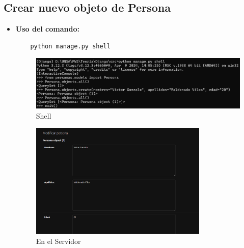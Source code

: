 \documentclass{article}
\begin{document}
  \subsection{Crear nuevo objeto de Persona}
  \begin{itemize}
    \item \textbf{Uso del comando:}
    \begin{lstlisting}
    python manage.py shell
    \end{lstlisting}
    \begin{figure}[H]
      \centering
      \includegraphics[width=1\textwidth, keepaspectratio]{img/shell.png}
      \caption{Shell}
    \end{figure}
    \begin{figure}[H]
      \centering
      \includegraphics[width=0.8\textwidth, keepaspectratio]{img/Server1.png}
      \caption{En el Servidor}
    \end{figure}
  \end{itemize}
  
\end{document}
